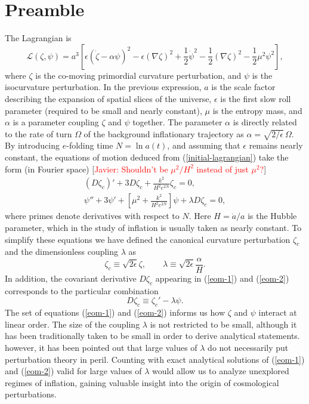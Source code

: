 \documentclass[
 aip,
 jmp,
 amsmath,amssymb,
 reprint,
 nofootinbib,
]{revtex4-2}
\def\bea{\begin{eqnarray}}
\def\eea{\end{eqnarray}}
\def\be{\begin{equation}}
\def\ee{\end{equation}}
\begin{document}
\section{Preamble}

The Lagrangian is
\be
\mathcal L (\zeta , \psi) = a^3 \left[ \epsilon \left( \dot \zeta - \alpha \psi \right)^2 - \epsilon (\nabla \zeta)^2 + \frac{1}{2} \dot \psi^2 - \frac{1}{2} (\nabla \zeta)^2 - \frac{1}{2} \mu^2 \psi^2  \right] , \label{initial-lagrangian}
\ee
where $\zeta$ is the co-moving primordial curvature perturbation, and $\psi$ is the isocurvature perturbation. In the previous expression, $a$ is the scale factor describing the expansion of spatial slices of the universe, $\epsilon$ is the first slow roll parameter (required to be small and nearly constant), $\mu$ is the entropy mass, and $\alpha$ is a parameter coupling $\zeta$ and $\psi$ together. The parameter $\alpha$ is directly related to the rate of turn $\Omega$ of the background inflationary trajectory as $\alpha = \sqrt{2/\epsilon} \, \Omega $. By introducing $e$-folding time $N = \ln a(t)$, and assuming that $\epsilon$ remains nearly constant, the equations of motion deduced from (\ref{initial-lagrangian}) take the form (in Fourier space) [\textcolor{red}{Javier: Shouldn't be $\mu^2/H^2$ instead of just $\mu^2$?}]
\bea
 ( D \zeta_c ) ' + 3 D\zeta_c + \frac{k^2}{H^2 e^{2N}} \zeta_c =0  , \label{eom-1} \\
\psi'' + 3 \psi '+ \left[ \mu^2 + \frac{k^2}{H^2 e^{2N}} \right] \psi+ \lambda D \zeta_c = 0 , \label{eom-2} 
\eea
where primes denote derivatives with respect to $N$. Here $H = \dot a / a$ is the Hubble parameter, which in the study of inflation is usually taken as nearly constant. To simplify these equations we have defined the canonical curvature perturbation $\zeta_c$ and the dimensionless coupling $\lambda$ as
\be
\zeta_c \equiv \sqrt{2 \epsilon} \zeta , \qquad \lambda \equiv \sqrt{2 \epsilon} \frac{\alpha}{H} .
\ee 
In addition, the covariant derivative $D \zeta_c$ appearing in (\ref{eom-1}) and (\ref{eom-2}) corresponds to the particular combination
\be
D \zeta_c \equiv \zeta_c ' - \lambda \psi .
\ee
The set of equations (\ref{eom-1}) and (\ref{eom-2}) informs us how $\zeta$ and $\psi$ interact at linear order. The size of the coupling $\lambda$ is not restricted to be small, although it has been traditionally taken to be small in order to derive analytical statements. however, it has been pointed out that large values of $\lambda$ do not necessarily put perturbation theory in peril. Counting with exact analytical solutions of (\ref{eom-1}) and (\ref{eom-2}) valid for large values of $\lambda$ would allow us to analyze unexplored regimes of inflation, gaining valuable insight into the origin of cosmological perturbations.
\end{document}
